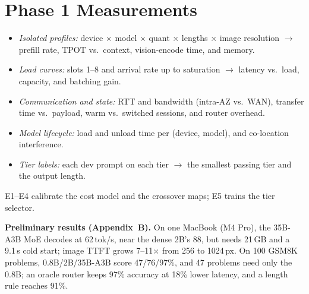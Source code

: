 \documentclass[10pt,twocolumn,letterpaper]{article}
\newcommand{\para}[1]{\textbf{#1}\hspace{0.4em}}
\begin{document}
\section{Phase 1 Measurements}
\begin{itemize}
\item[\textbf{E1}] \emph{Isolated profiles:} device $\times$ model $\times$
quant $\times$ lengths $\times$ image resolution $\rightarrow$ prefill rate,
TPOT vs.\ context, vision-encode time, and memory.
\item[\textbf{E2}] \emph{Load curves:} slots 1--8 and arrival rate up to
saturation $\rightarrow$ latency vs.\ load, capacity, and batching gain.
\item[\textbf{E3}] \emph{Communication and state:} RTT and bandwidth (intra-AZ
vs.\ WAN), transfer time vs.\ payload, warm vs.\ switched sessions, and router
overhead.
\item[\textbf{E4}] \emph{Model lifecycle:} load and unload time per (device,
model), and co-location interference.
\item[\textbf{E5}] \emph{Tier labels:} each dev prompt on each tier
$\rightarrow$ the smallest passing tier and the output length.
\end{itemize}
E1--E4 calibrate the cost model and the crossover maps; E5 trains the tier
selector.

\para{Preliminary results (Appendix~B).} On one MacBook (M4 Pro), the
35B-A3B MoE decodes at 62\,tok/s, near the dense 2B's 88, but needs 21\,GB and
a 9.1\,s cold start; image TTFT grows 7--11$\times$ from 256 to 1024\,px. On
100 GSM8K problems, 0.8B/2B/35B-A3B score 47/76/97\%, and 47 problems need
only the 0.8B; an oracle router keeps 97\% accuracy at 18\% lower latency, and
a length rule reaches 91\%.
\end{document}

